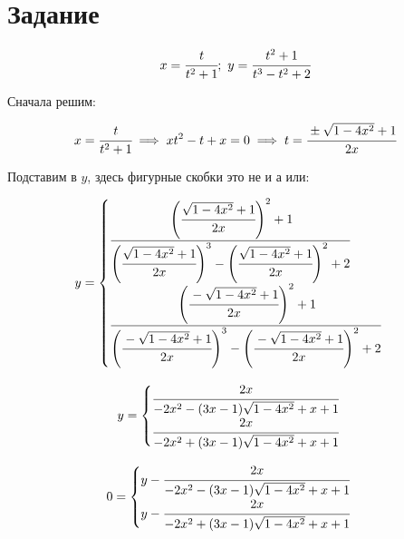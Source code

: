 \section{Задание}

\begin{equation}
    x = \cfrac{t}{t^2 + 1}; \  y = \cfrac{t^2 + 1}{t^3 - t^2 + 2}
\end{equation}

Сначала решим:

\begin{equation}
    x = \cfrac{t}{t^2+1} \implies xt^2 - t + x = 0 \implies t = \cfrac{\pm\sqrt{1 - 4x^2} + 1}{2x}
\end{equation}

Подставим в $y$, здесь фигурные скобки это не и а или:

\begin{equation}
    y = 
    \begin{cases}
        \cfrac{\left( \cfrac{\sqrt{1 - 4x^2} + 1}{2x} \right)^2 + 1}{\left( \cfrac{\sqrt{1 - 4x^2} + 1}{2x} \right)^3 - \left( \cfrac{\sqrt{1 - 4x^2} + 1}{2x} \right)^2 + 2} \\        
        \cfrac{\left( \cfrac{-\sqrt{1 - 4x^2} + 1}{2x} \right)^2 + 1}{\left( \cfrac{-\sqrt{1 - 4x^2} + 1}{2x} \right)^3 - \left( \cfrac{-\sqrt{1 - 4x^2} + 1}{2x} \right)^2 + 2} \\        
    \end{cases}
\end{equation}

\begin{equation}
    y = 
    \begin{cases}
        \cfrac{2 x}{-2 x^2 - (3x - 1) \sqrt{1 - 4 x^2} + x + 1} \\        
        \cfrac{2 x}{-2 x^2 + (3 x - 1) \sqrt{1 - 4 x^2} + x + 1}
    \end{cases}
\end{equation}

\begin{equation}
    0 = 
    \begin{cases}
        y - \cfrac{2 x}{-2 x^2 - (3x - 1) \sqrt{1 - 4 x^2} + x + 1} \\        
        y - \cfrac{2 x}{-2 x^2 + (3 x - 1) \sqrt{1 - 4 x^2} + x + 1}
    \end{cases}
\end{equation}

